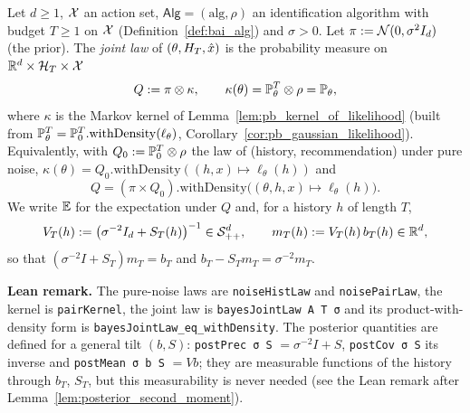 \begin{definition}\label{def:bayes_joint}
\leanok
{}
Let $d\ge1$, $\mathcal{X}$ an action set, $\mathsf{Alg} = (\mathrm{alg},\rho)$ an identification algorithm
with budget $T\ge1$ on $\mathcal{X}$ (Definition~\ref{def:bai_alg}) and $\sigma>0$. Let
$\pi := \mathcal{N}(0,\sigma^2I_d)$ (the prior). The \emph{joint law} of $(\theta,H_T,\hat{x})$ is
the probability measure on $\mathbb{R}^d\times\mathcal{H}_T\times\mathcal{X}$
\[
  Q := \pi\otimes\kappa,\qquad \kappa(\theta) = \mathbb{P}_\theta^T\otimes\rho = \mathbb{P}_\theta ,
\]
where $\kappa$ is the Markov kernel of Lemma~\ref{lem:pb_kernel_of_likelihood} (built from
$\mathbb{P}_\theta^T = \mathbb{P}_0^T.\mathrm{withDensity}(\ell_\theta)$,
Corollary~\ref{cor:pb_gaussian_likelihood}). Equivalently, with $Q_0 := \mathbb{P}_0^T\otimes\rho$
the law of (history, recommendation) under pure noise,
$\kappa(\theta) = Q_0.\mathrm{withDensity}((h,x)\mapsto\ell_\theta(h))$ and
\[
  Q = (\pi\times Q_0).\mathrm{withDensity}\big((\theta,h,x)\mapsto\ell_\theta(h)\big) .
\]
We write $\mathbb{E}$ for the expectation under $Q$ and, for
a history $h$ of length $T$,
\[
  V_T(h) := \big(\sigma^{-2}I_d+S_T(h)\big)^{-1}\in\mathcal{S}_{++}^{d},\qquad m_T(h) := V_T(h)\,b_T(h)\in\mathbb{R}^d ,
\]
so that $(\sigma^{-2}I + S_T)m_T = b_T$ and $b_T - S_Tm_T = \sigma^{-2}m_T$.
\end{definition}

\textbf{Lean remark.} The pure-noise laws are \texttt{noiseHistLaw} and \texttt{noisePairLaw},
the kernel is \texttt{pairKernel}, the joint law is \texttt{bayesJointLaw A T σ} and its
product-with-density form is \texttt{bayesJointLaw\_eq\_withDensity}. The posterior quantities
are defined for a general tilt $(b, S)$: \texttt{postPrec σ S} $= \sigma^{-2}I + S$,
\texttt{postCov σ S} its inverse and \texttt{postMean σ b S} $= V b$; they are measurable
functions of the history through $b_T$, $S_T$, but this measurability is never needed (see the
Lean remark after Lemma~\ref{lem:posterior_second_moment}).

